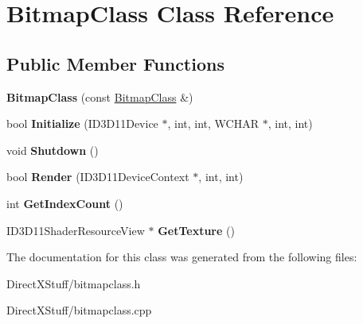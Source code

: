 \hypertarget{class_bitmap_class}{\section{Bitmap\-Class Class Reference}
\label{class_bitmap_class}
}
\subsection*{Public Member Functions}
\begin{DoxyCompactItemize}
\item 
\hypertarget{class_bitmap_class_a0933d9b08bfd5035e80c9c727456dcbb}{{\bfseries Bitmap\-Class} (const \hyperlink{class_bitmap_class}{Bitmap\-Class} \&)}\label{class_bitmap_class_a0933d9b08bfd5035e80c9c727456dcbb}

\item 
\hypertarget{class_bitmap_class_a25c64d7447ecd1abdcf5b27c5ccfb8f8}{bool {\bfseries Initialize} (I\-D3\-D11\-Device $\ast$, int, int, W\-C\-H\-A\-R $\ast$, int, int)}\label{class_bitmap_class_a25c64d7447ecd1abdcf5b27c5ccfb8f8}

\item 
\hypertarget{class_bitmap_class_a5d8c2363514af59acd8c2f3ee042294b}{void {\bfseries Shutdown} ()}\label{class_bitmap_class_a5d8c2363514af59acd8c2f3ee042294b}

\item 
\hypertarget{class_bitmap_class_aec18a682045976ffc8c469b8454d2cd1}{bool {\bfseries Render} (I\-D3\-D11\-Device\-Context $\ast$, int, int)}\label{class_bitmap_class_aec18a682045976ffc8c469b8454d2cd1}

\item 
\hypertarget{class_bitmap_class_aaafad2742ba7dcf9bcb3556579e7d9e5}{int {\bfseries Get\-Index\-Count} ()}\label{class_bitmap_class_aaafad2742ba7dcf9bcb3556579e7d9e5}

\item 
\hypertarget{class_bitmap_class_a9fc1968daa483cea1fede7d6785a7254}{I\-D3\-D11\-Shader\-Resource\-View $\ast$ {\bfseries Get\-Texture} ()}\label{class_bitmap_class_a9fc1968daa483cea1fede7d6785a7254}

\end{DoxyCompactItemize}


The documentation for this class was generated from the following files\-:\begin{DoxyCompactItemize}
\item 
Direct\-X\-Stuff/bitmapclass.\-h\item 
Direct\-X\-Stuff/bitmapclass.\-cpp\end{DoxyCompactItemize}
